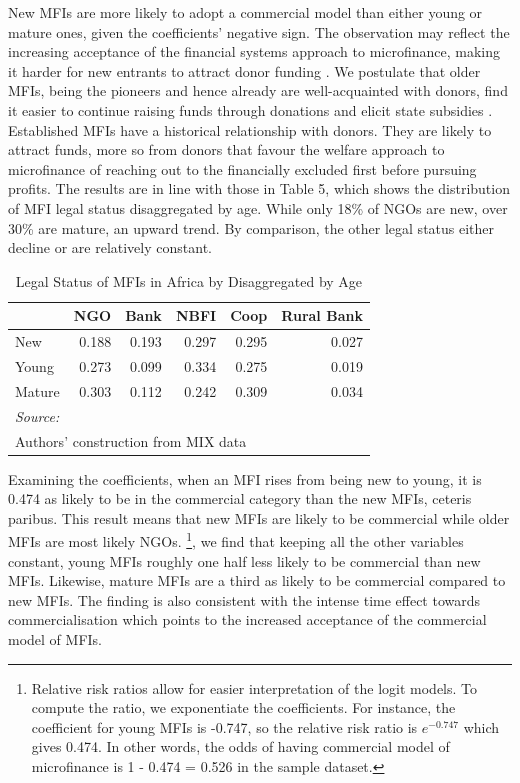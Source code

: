 \documentclass[a4paper, nobind]{templates/ociamthesis}
\begin{document}
New MFIs are more likely to adopt a commercial model than either young or mature ones, given the coefficients' negative sign. The observation may reflect the increasing acceptance of the financial systems approach to microfinance, making it harder for new entrants to attract donor funding \autocite{d2017ngos}. We postulate that older MFIs, being the pioneers and hence already are well-acquainted with donors, find it easier to continue raising funds through donations and elicit state subsidies \autocite{d2013unsubsidized,mia2017mission}. Established MFIs have a historical relationship with donors. They are likely to attract funds, more so from donors that favour the welfare approach to microfinance of reaching out to the financially excluded first before pursuing profits. The results are in line with those in Table 5, which shows the distribution of MFI legal status disaggregated by age. While only 18\% of NGOs are new, over 30\% are mature, an upward trend. By comparison, the other legal status either decline or are relatively constant.

\begin{table}

\caption{\label{tab:unnamed-chunk-35}Legal Status of MFIs in Africa by Disaggregated by Age}
\centering
\begin{tabular}[t]{lrrrrr}
\toprule
  & NGO & Bank & NBFI & Coop & Rural Bank\\
\midrule
New & 0.188 & 0.193 & 0.297 & 0.295 & 0.027\\
Young & 0.273 & 0.099 & 0.334 & 0.275 & 0.019\\
Mature & 0.303 & 0.112 & 0.242 & 0.309 & 0.034\\
\bottomrule
\multicolumn{6}{l}{\rule{0pt}{1em}\textit{Source: }}\\
\multicolumn{6}{l}{\rule{0pt}{1em}Authors' construction from MIX data}\\
\end{tabular}
\end{table}

Examining the coefficients, when an MFI rises from being new to young, it is 0.474 as likely to be in the commercial category than the new MFIs, ceteris paribus. This result means that new MFIs are likely to be commercial while older MFIs are most likely NGOs. \footnote{Relative risk ratios allow for easier interpretation of the logit models. To compute the ratio, we exponentiate the coefficients. For instance, the coefficient for young MFIs is -0.747, so the relative risk ratio is \(e^{-0.747}\) which gives 0.474. In other words, the odds of having commercial model of microfinance is 1 - 0.474 = 0.526 in the sample dataset.}, we find that keeping all the other variables constant, young MFIs roughly one half less likely to be commercial than new MFIs. Likewise, mature MFIs are a third as likely to be commercial compared to new MFIs. The finding is also consistent with the intense time effect towards commercialisation which points to the increased acceptance of the commercial model of MFIs.
\end{document}
